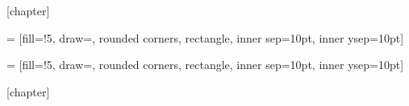 [chapter]

 = [fill=!5,
                         draw=,
                         rounded corners,
    rectangle, inner sep=10pt, inner ysep=10pt]

\newcommand{\defn}[2][]
{\stepcounter{defcounter}
 \setlength{\netlength}{\textwidth}
 \addtolength{\netlength}{-20pt}
 
 \bigskip\noindent
 \begin{tikzpicture}
   \node[dboxstyle] (dbox)
   {\begin{minipage}{\netlength}
    \ifthenelse{\equal{#1}{\empty}}{\smallskip}{\medskip}
    #2
    \end{minipage}
    };
   \node[inner ysep=0pt] at (dbox.north west) [anchor=west, xshift=2mm,  fill=white, text=\defcolorfill, top color=white, bottom color=\defcolorfill!5, rounded corners]
   {\textbf{\large Définition \arabic{defcounter}}
    \ifthenelse{\equal{#1}{\empty}}{}{{\large(#1)}}
    };
 \end{tikzpicture}
 }



 = [fill=!5,
draw=,
rounded corners,
rectangle, inner sep=10pt, inner ysep=10pt]

\newcommand{\retenir}[2][]
{%
	\setlength{\netlength}{\textwidth}
	\addtolength{\netlength}{-20pt}
	
	\bigskip\noindent
	\begin{tikzpicture}
	\node[dboxstyle] (dbox)
	{\begin{minipage}{\netlength}
		\ifthenelse{\equal{#1}{\empty}}{\smallskip}{\medskip}
		#2
		\end{minipage}
	};
	\node[inner ysep=0pt] at (dbox.north west) [anchor=west, xshift=2mm,  fill=white, text=\defcolorfill, top color=white, bottom color=\defcolorfill!5, rounded corners]
	{\textbf{\large A retenir !}
		\ifthenelse{\equal{#1}{\empty}}{}{{\large(#1)}}
	};
	\end{tikzpicture}
}


[chapter]

